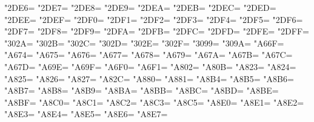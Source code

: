 \XeTeXcharclass"2DE6=\KclassCM
\XeTeXcharclass"2DE7=\KclassCM
\XeTeXcharclass"2DE8=\KclassCM
\XeTeXcharclass"2DE9=\KclassCM
\XeTeXcharclass"2DEA=\KclassCM
\XeTeXcharclass"2DEB=\KclassCM
\XeTeXcharclass"2DEC=\KclassCM
\XeTeXcharclass"2DED=\KclassCM
\XeTeXcharclass"2DEE=\KclassCM
\XeTeXcharclass"2DEF=\KclassCM
\XeTeXcharclass"2DF0=\KclassCM
\XeTeXcharclass"2DF1=\KclassCM
\XeTeXcharclass"2DF2=\KclassCM
\XeTeXcharclass"2DF3=\KclassCM
\XeTeXcharclass"2DF4=\KclassCM
\XeTeXcharclass"2DF5=\KclassCM
\XeTeXcharclass"2DF6=\KclassCM
\XeTeXcharclass"2DF7=\KclassCM
\XeTeXcharclass"2DF8=\KclassCM
\XeTeXcharclass"2DF9=\KclassCM
\XeTeXcharclass"2DFA=\KclassCM
\XeTeXcharclass"2DFB=\KclassCM
\XeTeXcharclass"2DFC=\KclassCM
\XeTeXcharclass"2DFD=\KclassCM
\XeTeXcharclass"2DFE=\KclassCM
\XeTeXcharclass"2DFF=\KclassCM
\XeTeXcharclass"302A=\KclassCM
\XeTeXcharclass"302B=\KclassCM
\XeTeXcharclass"302C=\KclassCM
\XeTeXcharclass"302D=\KclassCM
\XeTeXcharclass"302E=\KclassCM
\XeTeXcharclass"302F=\KclassCM
\XeTeXcharclass"3099=\KclassCM
\XeTeXcharclass"309A=\KclassCM
\XeTeXcharclass"A66F=\KclassCM
\XeTeXcharclass"A674=\KclassCM
\XeTeXcharclass"A675=\KclassCM
\XeTeXcharclass"A676=\KclassCM
\XeTeXcharclass"A677=\KclassCM
\XeTeXcharclass"A678=\KclassCM
\XeTeXcharclass"A679=\KclassCM
\XeTeXcharclass"A67A=\KclassCM
\XeTeXcharclass"A67B=\KclassCM
\XeTeXcharclass"A67C=\KclassCM
\XeTeXcharclass"A67D=\KclassCM
\XeTeXcharclass"A69E=\KclassCM
\XeTeXcharclass"A69F=\KclassCM
\XeTeXcharclass"A6F0=\KclassCM
\XeTeXcharclass"A6F1=\KclassCM
\XeTeXcharclass"A802=\KclassCM
\XeTeXcharclass"A80B=\KclassCM
\XeTeXcharclass"A823=\KclassCM
\XeTeXcharclass"A824=\KclassCM
\XeTeXcharclass"A825=\KclassCM
\XeTeXcharclass"A826=\KclassCM
\XeTeXcharclass"A827=\KclassCM
\XeTeXcharclass"A82C=\KclassCM
\XeTeXcharclass"A880=\KclassCM
\XeTeXcharclass"A881=\KclassCM
\XeTeXcharclass"A8B4=\KclassCM
\XeTeXcharclass"A8B5=\KclassCM
\XeTeXcharclass"A8B6=\KclassCM
\XeTeXcharclass"A8B7=\KclassCM
\XeTeXcharclass"A8B8=\KclassCM
\XeTeXcharclass"A8B9=\KclassCM
\XeTeXcharclass"A8BA=\KclassCM
\XeTeXcharclass"A8BB=\KclassCM
\XeTeXcharclass"A8BC=\KclassCM
\XeTeXcharclass"A8BD=\KclassCM
\XeTeXcharclass"A8BE=\KclassCM
\XeTeXcharclass"A8BF=\KclassCM
\XeTeXcharclass"A8C0=\KclassCM
\XeTeXcharclass"A8C1=\KclassCM
\XeTeXcharclass"A8C2=\KclassCM
\XeTeXcharclass"A8C3=\KclassCM
\XeTeXcharclass"A8C5=\KclassCM
\XeTeXcharclass"A8E0=\KclassCM
\XeTeXcharclass"A8E1=\KclassCM
\XeTeXcharclass"A8E2=\KclassCM
\XeTeXcharclass"A8E3=\KclassCM
\XeTeXcharclass"A8E4=\KclassCM
\XeTeXcharclass"A8E5=\KclassCM
\XeTeXcharclass"A8E6=\KclassCM
\XeTeXcharclass"A8E7=\KclassCM
